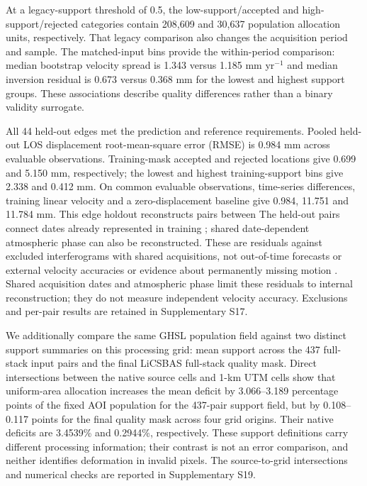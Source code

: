 \documentclass[pdflatex,sn-nature]{sn-jnl}
\providecommand{\DIFadd}[1]{{\protect\color{blue} \sf #1}} %
\providecommand{\DIFdel}[1]{{\protect\color{red} \scriptsize #1}} %
\providecommand{\DIFaddbegin}{} %
\providecommand{\DIFaddend}{} %
\providecommand{\DIFdelbegin}{} %
\providecommand{\DIFdelend}{} %
\begin{document}
At a legacy-support threshold of 0.5, the low-support/accepted and high-support/rejected categories contain 208,609 and 30,637 population allocation units, respectively. That legacy comparison also changes the acquisition period and sample. The matched-input bins provide the within-period comparison: median bootstrap velocity spread is 1.343 versus 1.185 mm yr$^{-1}$ and median inversion residual is 0.673 versus 0.368 mm for the lowest and highest support groups. These associations describe quality differences rather than a binary validity surrogate.

All 44 held-out edges met the prediction and reference requirements. Pooled held-out LOS displacement root-mean-square error (RMSE) is 0.984 mm across evaluable observations. Training-mask accepted and rejected locations give 0.699 and 5.150 mm, respectively; the lowest and highest training-support bins give 2.338 and 0.412 mm. On common evaluable observations, time-series differences, training linear velocity and a zero-displacement baseline give 0.984, 11.751 and 11.784 mm. \DIFdelbegin \DIFdel{This edge holdout reconstructs pairs between }\DIFdelend \DIFaddbegin \DIFadd{The held-out pairs connect }\DIFaddend dates already represented in training\DIFdelbegin \DIFdel{; shared date-dependent atmospheric phase can also be reconstructed. These are residuals against excluded interferograms with shared acquisitions, not out-of-time forecasts or external velocity accuracies or evidence about permanently missing motion}\DIFdelend \DIFaddbegin \DIFadd{. Shared acquisition dates and atmospheric phase limit these residuals to internal reconstruction; they do not measure independent velocity accuracy}\DIFaddend . Exclusions and per-pair results are retained in Supplementary S17.

We additionally compare the same GHSL population field against two distinct support summaries on this processing grid: mean support across the 437 full-stack input pairs and the final LiCSBAS full-stack quality mask. Direct intersections between the native source cells and 1-km UTM cells show that uniform-area allocation increases the mean deficit by 3.066--3.189 percentage points of the fixed AOI population for the 437-pair support field, but by 0.108--0.117 points for the final quality mask across four grid origins. Their native deficits are 3.4539\% and 0.2944\%, respectively. These support definitions carry different processing information; their contrast is not an error comparison, and neither identifies deformation in invalid pixels. The source-to-grid intersections and numerical checks are reported in Supplementary S19.
\end{document}
